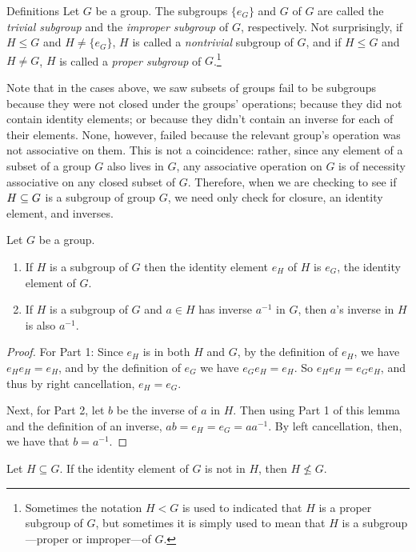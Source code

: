 \begin{df}{Definitions} Let $G$ be a group. The subgroups $\{e_G\}$ and $G$ of
$G$ are called the \textit{trivial subgroup} and the \textit{improper
subgroup} of $G$, respectively. Not surprisingly, if $H\leq G$
and $H\neq \{e_G\}$, $H$ is called a \textit{nontrivial} subgroup
of $G$, and if $H\leq G$ and $H\neq G$, $H$ is called a \textit{proper subgroup} of $G$.\footnote{Sometimes the notation $H<G$
is used to indicated that $H$ is a proper subgroup of $G$, but
sometimes it is simply used to mean that $H$ is a
subgroup---proper or improper---of $G$.}\end{df}


Note that in the cases above, we saw subsets of groups fail to be subgroups because
they were not closed under the groups' operations; because they did not contain identity elements; or because they didn't contain an
inverse for each of their elements. None, however, failed  because the relevant group's operation was not associative on them.
This is not a coincidence: rather, since any element of a subset of a group $G$ also lives in $G$, any associative operation on $G$ is of
 necessity associative on any closed subset of $G$. Therefore, when we are checking to see if $H\subseteq G$ is a subgroup of group $G$, we need only check for
 closure, an identity element, and inverses.
\begin{lem}\label{subsame} Let $G$ be a group. \begin{enumerate}
\item
If $H$ is a subgroup of $G$ then the identity element $e_H$ of $H$
is $e_G$, the identity element of $G$.
\item If $H$ is a subgroup of $G$ and $a\in H$ has inverse $a^{-1}$ in $G$, then $a$'s inverse in $H$ is also $a^{-1}$.
\end{enumerate}\end{lem}

\begin{proof} For Part 1:  Since $e_H$ is in both $H$ and $G$, by the definition
    of $e_H$, we have
    $e_He_H=e_H$, and by the definition of $e_G$ we have $e_Ge_H=e_H$. So $e_He_H=e_Ge_H$, and thus by right
    cancellation, $e_H=e_G$.

    Next, for Part 2, let $b$ be the inverse of $a$ in $H$. Then using Part 1 of this lemma and the definition of an inverse, $ab=e_H=e_G=aa^{-1}$.  By left cancellation, then, we have that $b=a^{-1}$.
    \end{proof}

\begin{cor}Let $H\subseteq G$.  If the identity element of $G$ is not in $H$, then $H\not\leq G$.\end{cor}


